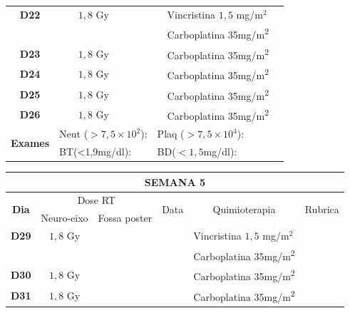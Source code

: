 \documentclass[11pt,a4paper,oldfontcommands]{memoir}
\begin{document}
\begin{center}
\begin{longtable}{p{1cm}p{2cm}|p{2cm}|p{1cm}|p{4cm}|p{3cm}}
	\hline
	\multicolumn{1}{c|}{\multirow{1}{*}{\textbf{D22}}}&\multicolumn{1}{c|}{\(1,8\) Gy}&&&{Vincristina \(1,5\) mg/m\(^2\)}&\\
	\multicolumn{1}{c|}{\multirow{1}{*}{\textbf{}}}&\multicolumn{1}{c|}{}&&&{Carboplatina 35mg/m\textsuperscript{2}}&\\
    \multicolumn{1}{c|}{\multirow{1}{*}{\textbf{D23}}}&\multicolumn{1}{c|}{\(1,8\) Gy}&&&{Carboplatina 35mg/m\textsuperscript{2}}&\\
    \multicolumn{1}{c|}{\multirow{1}{*}{\textbf{D24}}}&\multicolumn{1}{c|}{\(1,8\) Gy}&&&{Carboplatina 35mg/m\textsuperscript{2}}&\\
    \multicolumn{1}{c|}{\multirow{1}{*}{\textbf{D25}}}&\multicolumn{1}{c|}{\(1,8\) Gy}&&&{Carboplatina 35mg/m\textsuperscript{2}}&\\
    \multicolumn{1}{c|}{\multirow{1}{*}{\textbf{D26}}}&\multicolumn{1}{c|}{\(1,8\) Gy}&&&{Carboplatina 35mg/m\textsuperscript{2}}&\\
    \hline
    \multicolumn{1}{c|}{\multirow{2}{*}{\textbf{Exames}}}&\multicolumn{2}{l|}{Neut (\(>7,5\times10^2\)):}&\multicolumn{2}{l|}{Plaq (\(>7,5\times10^4\)):}&\\
    \cline{2-6}
    \multicolumn{1}{c|}{\multirow{2}{*}{{}}}&\multicolumn{2}{l|}{BT(<1,9mg/dl):}&\multicolumn{2}{l|}{BD(\(<1,5\)mg/dl):}&
    \\
    \hline
\end{longtable}
\begin{longtable}{p{1cm}p{2cm}|p{2cm}|p{1cm}|p{4cm}|p{3cm}}
	\hline
	\multicolumn{6}{c}{\textbf{SEMANA 5}}\\
\hline
    \multicolumn{1}{c|}{\multirow{2}{*}{\textbf{Dia}}}&\multicolumn{2}{c|}{Dose RT}&\multicolumn{1}{c|}{\multirow{2}{*}{Data}}&\multicolumn{1}{c|}{\multirow{2}{*}{Quimioterapia}}&\multicolumn{1}{c}{\multirow{2}{*}{Rubrica}} \\
    \cline{2-3}
    \multicolumn{1}{c|}{\multirow{1}{*}{}}&{Neuro-eixo}&{Fossa poster}&& \\
	\hline
	\multicolumn{1}{c|}{\multirow{1}{*}{\textbf{D29}}}&\multicolumn{1}{c|}{\(1,8\) Gy}&&&{Vincristina \(1,5\) mg/m\(^2\)}&\\
	\multicolumn{1}{c|}{\multirow{1}{*}{\textbf{}}}&\multicolumn{1}{c|}{}&&&{Carboplatina 35mg/m\textsuperscript{2}}&\\
    \multicolumn{1}{c|}{\multirow{1}{*}{\textbf{D30}}}&\multicolumn{1}{c|}{\(1,8\) Gy}&&&{Carboplatina 35mg/m\textsuperscript{2}}&\\
    \multicolumn{1}{c|}{\multirow{1}{*}{\textbf{D31}}}&\multicolumn{1}{c|}{\(1,8\) Gy}&&&{Carboplatina 35mg/m\textsuperscript{2}}&\\

\end{longtable}
\end{center}
\end{document}
